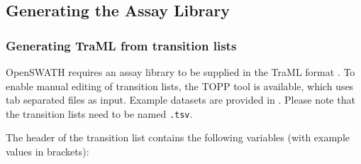 \subsection{Generating the Assay Library}
\subsubsection{Generating TraML from transition lists}
OpenSWATH requires an assay library to be supplied in the TraML format \cite{Deutsch2012TraMLA}. To enable manual editing of transition lists, the TOPP tool  is available, which uses tab separated files as input. Example datasets are provided in . Please note that the transition lists need to be named \texttt{.tsv}.

\noindent The header of the transition list contains the following variables (with example values in brackets):


